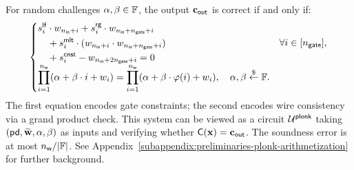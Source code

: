 For random challenges $\alpha, \beta \in \mathbb{F}$, the output $\mathbf{c}_\mathsf{out}$ is correct
if and only if:
\begin{equation}\label{equation:plonk-system-of-constraints-with-challenges}
\begin{cases}
\begin{aligned}
	&s_i^{\mathsf{lf}} \cdot w_{n_\mathsf{in} + i} + s_i^{\mathsf{rg}} \cdot w_{n_\mathsf{in} + n_\mathsf{gate} + i}
	\\
	&\quad + s_i^{\mathsf{mlt}} \cdot (w_{n_\mathsf{in} + i} \cdot w_{n_\mathsf{in} + n_\mathsf{gate} + i})
	\\
	&\quad + s_i^{\mathsf{cnst}} - w_{n_\mathsf{in} + 2 n_\mathsf{gate} + i} = 0
\end{aligned}
& \forall i \in [n_\mathsf{gate}],
\\[15pt]
\displaystyle
\prod_{i = 1}^{n_\mathsf{w}}(\alpha + \beta \cdot i + w_i)
=
\prod_{i = 1}^{n_\mathsf{w}}(\alpha + \beta \cdot \varphi(i) + w_i),
\quad \alpha, \beta \stackrel{\$}{\gets} \mathbb{F}.
\end{cases}
\end{equation}
The first equation encodes gate constraints;
the second encodes wire consistency via a grand product check.
This system can be viewed as a circuit $\mathcal{U}^\mathsf{plonk}$
taking $(\mathsf{pd}, \widetilde{\mathbf{w}}, \alpha, \beta)$ as inputs
and verifying whether $\mathsf{C}(\mathbf{x}) = \mathbf{c}_\mathsf{out}$.
The soundness error is at most $n_\mathsf{w} / |\mathbb{F}|$.
\ifcameraready
\else
See Appendix~\ref{subappendix:preliminaries-plonk-arithmetization}
for further background.
\fi

